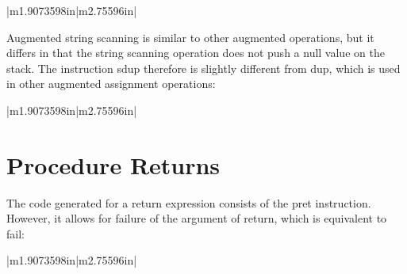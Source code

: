 \begin{center}
\tablelasttail{\hline}
\begin{xtabular}{|m{1.9073598in}|m{2.75596in}|}

\end{xtabular}
\end{center}

Augmented string scanning is similar to other augmented operations,
but it differs in that the string scanning operation does not push a
null value on the stack. The instruction sdup therefore is slightly
different from dup, which is used in other augmented assignment
operations:

\begin{center}
\tablelasttail{\hline}
\begin{xtabular}{|m{1.9073598in}|m{2.75596in}|}

\end{xtabular}
\end{center}


\section{Procedure Returns}

The code generated for a return expression consists of the pret
instruction. However, it allows for failure of the argument of return,
which is equivalent to fail:

\begin{center}
\tablelasttail{\hline}
\begin{xtabular}{|m{1.9073598in}|m{2.75596in}|}

\end{xtabular}
\end{center}

